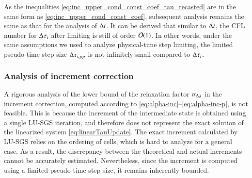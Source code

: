 As the inequalities \eqref{eq:inc_upper_cond_const_coef_tau_recasted}
are in the same form as \eqref{eq:inc_upper_cond_const_coef}, 
subsequent analysis remains the same as that for the analysis of $\mathrm\Delta t$. 
It can be derived that similar to $\mathrm\Delta t$, the CFL number 
for $\mathrm\Delta \tau _i$ after limiting is still of order $\mathcal{O}(1)$.
In other words,
under the same assumptions we used to analyze physical-time step limiting,
the limited pseudo-time step size $\mathrm\Delta \tau_{i,pp}$ is not infinitely small compared to $\mathrm\Delta \tau_i$.



\subsubsection{Analysis of increment correction}

A rigorous analysis of the lower bound of the relaxation factor $\alpha_{\mathrm\Delta,i}$ in the increment correction, computed according to \eqref{eq:alpha-inc}–\eqref{eq:alpha-inc-p}, is not feasible. 
This is because the increment of the intermediate state is obtained using a single LU-SGS iteration, and therefore does not represent the exact solution of the linearized system \eqref{eq:linearTauUpdate}. 
The exact increment calculated by LU-SGS relies on 
the ordering of cells, which is hard to analyze 
for a general case.
As a result, the discrepancy between the theoretical and actual increments cannot be accurately estimated. 
Nevertheless, since the increment is computed using a limited pseudo-time step size, it remains inherently bounded. 

